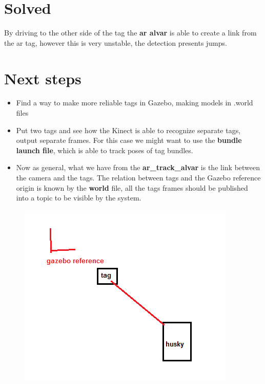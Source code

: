 \documentclass[11pt,a4paper]{article}
\begin{document}
\section{Solved}
By driving to the other side of the tag the \textbf{ar alvar} is able to create a link from the ar tag, however this is very unstable, the detection presents jumps.

\section{Next steps}
\begin{itemize}
\item Find a way to make more reliable tags in Gazebo, making models in .world files
\item Put two tags and see how the Kinect is able to recognize separate tags, output separate frames. For this case we might want to use the \textbf{bundle launch file}, which is able to track poses of tag bundles.
\item Now as general, what we have from the \textbf{ar{\_}track{\_}alvar} is the link between the camera and the tags. The relation between tags and the Gazebo reference origin is known by the \textbf{world} file, all the tags frames should be published into a topic to be visible by the system.
\end{itemize}


\begin{figure}[H]
	\center
	\includegraphics[width=.5\textwidth]{figures/gazebo_reference.png}
\end{figure}
\end{document}
